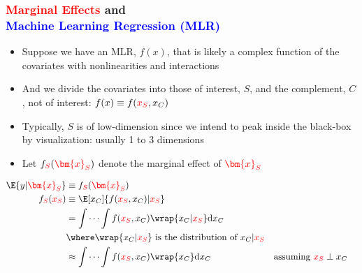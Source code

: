 \documentclass[11pt,dvipsnames,usenames,times]{beamer}
\newcommand*{\red}[1]{\textcolor{red}{#1}}%
\newcommand*{\blue}[1]{\textcolor{blue}{#1}}%
\begin{document}
\begin{frame}\frametitle{\bf\textcolor{red}{Marginal Effects} and\\ \blue{Machine Learning Regression (MLR)}}

\begin{itemize}
\item Suppose we have an MLR, $f(x)$, that is likely a complex 
function of the covariates with nonlinearities and interactions
\item And we divide the covariates into those of interest, $S$,
and the complement, $C$, not of interest: {$f(x) \equiv f(\red{x_S}, x_C)$}
\item Typically, $S$ is of low-dimension since we intend to peak inside the black-box by visualization:
usually 1 to 3 dimensions
\item Let $f_{\textcolor{red}{S}}(\textcolor{red}{\bm{x}_S})$ denote the marginal effect of $\textcolor{red}{\bm{x}_S}$
\end{itemize}
\begin{align*}
\E{y|\textcolor{red}{\bm{x}_S}} & \equiv f_{\textcolor{red}{S}}(\textcolor{red}{\bm{x}_S}) \\
f_{\red{S}}(\red{x_S}) & \equiv \E[x_C]{f(\red{x_S}, x_C)|\red{x_S}} \\
& = \int \cdots \int f(\red{x_S}, x_C) \wrap{x_C|\red{x_S}} \mathrm{d}x_C \\
& \where \wrap{x_C|\red{x_S}} \mbox{\ is the distribution of\ } x_C|\red{x_S}\\
& \approx \int \cdots \int f(\red{x_S}, x_C) \wrap{x_C} \mathrm{d}x_C & & \mbox{assuming\ } \red{x_S} \perp x_C 
\end{align*}

\end{frame}
\end{document}
